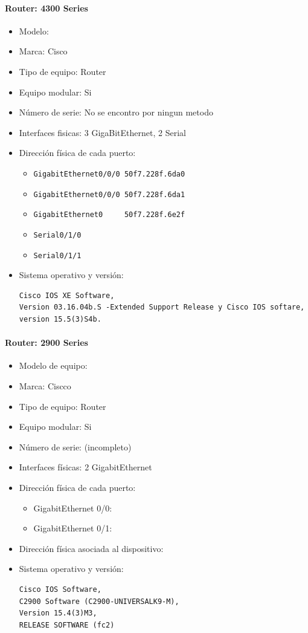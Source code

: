 \paragraph{Router: 4300 Series}
\begin{itemize}
  \item Modelo: 
  \item Marca: Cisco
  \item Tipo de equipo: Router
  \item Equipo modular: Si
  \item Número de serie: No se encontro por ningun metodo
  \item Interfaces fisicas: 3 GigaBitEthernet, 2 Serial
  \item Dirección física de cada puerto:
    \begin{itemize}
      \item \verb|GigabitEthernet0/0/0 50f7.228f.6da0|
      \item \verb|GigabitEthernet0/0/0 50f7.228f.6da1|
      \item \verb|GigabitEthernet0     50f7.228f.6e2f|
      \item \verb|Serial0/1/0|
      \item \verb|Serial0/1/1|
    \end{itemize}
  \item Sistema operativo y versión:
    \begin{verbatim}
Cisco IOS XE Software, 
Version 03.16.04b.S -Extended Support Release y Cisco IOS softare, 
version 15.5(3)S4b.
    \end{verbatim}
\end{itemize}

\paragraph{Router: 2900 Series}
\begin{itemize}
  \item Modelo de equipo: 
  \item Marca: Ciscco
  \item Tipo de equipo: Router
  \item Equipo modular: Si
  \item Número de serie:  (incompleto)
  \item Interfaces físicas: 2 GigabitEthernet
  \item Dirección física de cada puerto: 
  \begin{itemize}
    \item GigabitEthernet 0/0: 
    \item GigabitEthernet 0/1: 
  \end{itemize}

  \item Dirección física asociada al dispositivo:
  \item Sistema operativo y versión:
    \begin{verbatim}
Cisco IOS Software, 
C2900 Software (C2900-UNIVERSALK9-M), 
Version 15.4(3)M3, 
RELEASE SOFTWARE (fc2)
    \end{verbatim}
\end{itemize}

